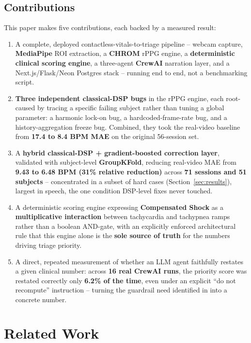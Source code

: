 \documentclass[conference]{IEEEtran}
\begin{document}
\subsection{\textbf{Contributions}}
This paper makes five contributions, each backed by a measured result:
\begin{enumerate}
    \item A complete, deployed contactless-vitals-to-triage pipeline -- webcam capture, \textbf{MediaPipe} ROI extraction, a \textbf{CHROM} rPPG engine, a \textbf{deterministic clinical scoring engine}, a three-agent \textbf{CrewAI} narration layer, and a Next.js/Flask/Neon Postgres stack -- running end to end, not a benchmarking script.
    \item \textbf{Three independent classical-DSP bugs} in the rPPG engine, each root-caused by tracing a specific failing subject rather than tuning a global parameter: a harmonic lock-on bug, a hardcoded-frame-rate bug, and a history-aggregation freeze bug. Combined, they took the real-video baseline from \textbf{17.4 to 8.4 BPM MAE} on the original 56-session set.
    \item A \textbf{hybrid classical-DSP + gradient-boosted correction layer}, validated with subject-level \textbf{GroupKFold}, reducing real-video MAE from \textbf{9.43 to 6.48 BPM (31\% relative reduction)} across \textbf{71 sessions and 51 subjects} -- concentrated in a subset of hard cases (Section~\ref{sec:results}), largest in speech, the one condition DSP-level fixes never touched.
    \item A deterministic scoring engine expressing \textbf{Compensated Shock} as a \textbf{multiplicative interaction} between tachycardia and tachypnea ramps rather than a boolean AND-gate, with an explicitly enforced architectural rule that this engine alone is the \textbf{sole source of truth} for the numbers driving triage priority.
    \item A direct, repeated measurement of whether an LLM agent faithfully restates a given clinical number: across \textbf{16 real CrewAI runs}, the priority score was restated correctly only \textbf{6.2\% of the time}, even under an explicit ``do not recompute'' instruction -- turning the guardrail need identified in \cite{b_warrier_agentic} into a concrete number.
\end{enumerate}

\section{\textbf{Related Work}}
\end{document}
